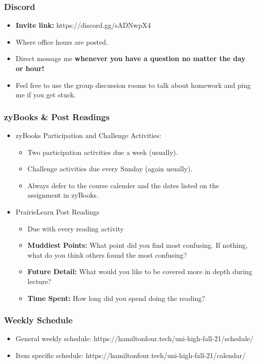 \documentclass{beamer}
\begin{document}
\begin{frame}
  \frametitle{Discord}
  \begin{itemize}
    \item \textbf{Invite link:} https://discord.gg/sADNwpX4
    \item Where office hours are posted.
    \item Direct message me \textbf{whenever you have a question no matter the day or hour!}
    \item Feel free to use the group discussion rooms to talk about homework and ping me if you get stuck. 
  \end{itemize}
\end{frame}

\begin{frame}
  \frametitle{zyBooks \& Post Readings}
  \begin{itemize}
    \item zyBooks Participation and Challenge Activities:
    \begin{itemize}
      \item Two participation activities due a week (usually).
      \item Challenge activities due every Sunday (again usually).
      \item Always defer to the course calender and the dates listed on the assignment in zyBooks.
    \end{itemize}
    \item PrairieLearn Post Readings
    \begin{itemize}
      \item Due with every reading activity
      \item \textbf{Muddiest Points: } What point did you find most confusing. If nothing, what do you think others found the most confusing?
      \item \textbf{Future Detail: } What would you like to be covered more in depth during lecture?
      \item \textbf{Time Spent: } How long did you spend doing the reading?
    \end{itemize}
  \end{itemize}
\end{frame}

\begin{frame}
  \frametitle{Weekly Schedule}
  \begin{itemize}
    \item General weekly schedule: https://hamiltonfour.tech/uni-high-fall-21/schedule/
    \item Item specific schedule: https://hamiltonfour.tech/uni-high-fall-21/calendar/
  \end{itemize}
\end{frame}
\end{document}
